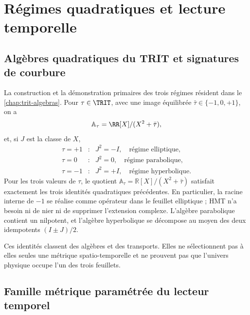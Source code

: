 
\chapter{Régimes quadratiques et lecture temporelle}
\label{chap:regimenes-cuadraticos-tiempo}

\section{Algèbres quadratiques du TRIT et signatures de courbure}
\label{sec:regimenes-cuadraticos-recibidos}

La construction et la démonstration primaires des trois régimes résident dans
le \cref{chap:trit-algebras}. Pour
\(\tau\in\TRIT\), avec une image équilibrée
\(\bar\tau\in\{-1,0,+1\}\), on a
\[
 \mathbb A_\tau=\RR[X]/(X^2+\bar\tau),
\]
et, si \(J\) est la classe de \(X\),
\[
\begin{array}{ccl}
 \tau=+1&:&J^2=-I,\quad\text{régime elliptique},\\
 \tau=0&:&J^2=0,\quad\text{régime parabolique},\\
 \tau=-1&:&J^2=+I,\quad\text{régime hyperbolique}.
\end{array}
\]
Pour les trois valeurs de \(\tau\), le quotient
\(\mathbb A_\tau=\mathbb R[X]/(X^2+\bar\tau)\) satisfait exactement les trois
identités quadratiques précédentes. En particulier, la racine interne de
\(-1\) se réalise comme opérateur dans le feuillet elliptique ; HMT n’a besoin ni de nier ni de
supprimer l’extension complexe. L’algèbre parabolique contient un nilpotent,
et l’algèbre hyperbolique se décompose au moyen des deux idempotents
\((I\pm J)/2\).

Ces identités classent des algèbres et des transports. Elles ne sélectionnent pas à elles
seules une métrique spatio-temporelle et ne prouvent pas que l’univers physique occupe l’un
des trois feuillets.

\section{Famille métrique paramétrée du lecteur temporel}
\label{sec:ansatz-metrico-tres-curvaturas}


